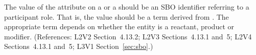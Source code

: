 The value of the  attribute on a \SpeciesReference or a
\ModifierSpeciesReference should be an SBO identifier referring to a
participant role.  That is, the value should be a term derived
from \sboparticipantrole.  The appropriate term depends on whether
the entity is a reactant, product or modifier.  (References: 
L2V2 Section~4.13.2; L2V3 Sections~4.13.1 and~5; L2V4 Sections~4.13.1 and~5;  
L3V1 Section~\ref{sec:sbo}.)
